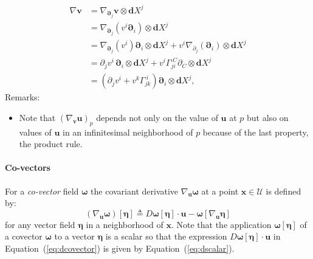 $$
\begin{aligned}
\nabla \bm{v} & =\nabla_{\bm{\partial}_j} \bm{v} \otimes \bm{d} X^j \\
& =\nabla_{\bm{\partial}_j}\left(v^i \bm{\partial}_i\right) \otimes \boldsymbol{d} X^j \\
& =\nabla_{\boldsymbol{\partial}_j}\left(v^i\right) \boldsymbol{\partial}_i \otimes \boldsymbol{d} X^j+v^i \nabla_{\partial_j}\left(\bm{\partial}_i\right) \otimes \boldsymbol{d} X^j \\
& =\partial_j v^i \, \bm{\partial}_i \otimes \boldsymbol{d} X^j+v^i \Gamma_{j i}^{. C} \partial_C \otimes \boldsymbol{d} X^j \\
& =\left(\partial_j v^i+v^k \Gamma_{j k}^{~ i}\right) \boldsymbol{\partial}_i \otimes \boldsymbol{d} X^j,
\end{aligned}
$$
Remarks:
\begin{itemize}
    \item Note that $\left(\nabla_{\mathbf{v}} \mathbf{u}\right)_p$ depends not only on the value of $\mathbf{u}$ at $p$ but also on values of $\mathbf{u}$ in an infinitesimal neighborhood of $p$ because of the last property, the product rule.
\end{itemize}

\paragraph{Co-vectors}
For a \emph{co-vector} field \(\boldsymbol{\omega}\) the covariant
derivative \(\nabla_{\boldsymbol{u}} \boldsymbol{\omega}\) at a point
\(\boldsymbol{x}\in\mathcal{U}\) is defined by: 
\begin{equation}
\left(\nabla_{\boldsymbol{u}} \boldsymbol{\omega}\right) \left[\boldsymbol{\eta}\right]\triangleq D \boldsymbol{\omega}\left[\boldsymbol{\eta}\right] \cdot{\boldsymbol{u}}-\boldsymbol{\omega}\left[\nabla_{\boldsymbol{u}} \boldsymbol{\eta}\right]
\label{eq:dcovector}
\end{equation} 
for any vector field \(\boldsymbol{\eta}\) in
a neighborhood of \(\boldsymbol{x}\). 
Note that the application
\(\boldsymbol{\omega}\left[\boldsymbol{\eta}\right]\) of a covector \(\boldsymbol{\omega}\) to a
vector \(\boldsymbol{\eta}\) is a scalar so that the expression
\(D \boldsymbol{\omega}\left[\boldsymbol{\eta}\right] \cdot{\boldsymbol{u}}\) in
Equation~(\ref{eq:dcovector}) is given by Equation~(\ref{eq:dscalar}).

